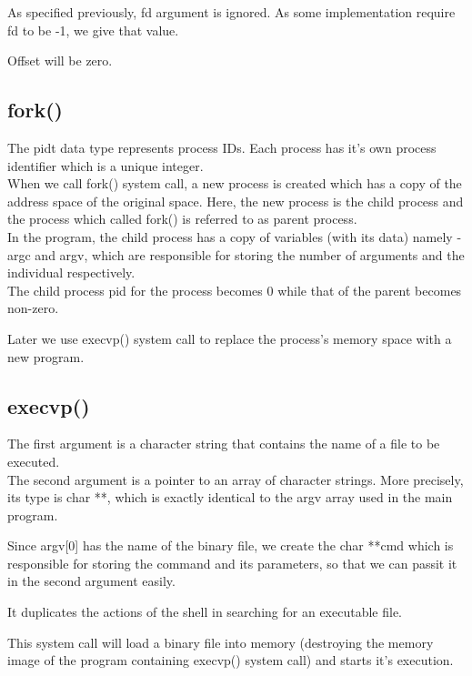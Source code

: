 \documentclass[12pt]{article}
\begin{document}
As specified previously, fd argument is ignored. As some implementation require fd to be -1, we give that value.

Offset will be zero.

\subsection{fork()}

The pid\textunderscore t  data type represents process IDs. Each process has it's own process identifier which is a unique integer. \\

When we call fork() system call, a new process is created which has a copy of the address space of the original space. Here, the new process is the child process and the process which called fork() is referred to as parent process. \\

In the program, the child process has a copy of variables (with its data) namely -  argc and argv, which are responsible for storing the number of arguments and the individual respectively. \\

The child process pid for the process becomes 0 while that of the parent becomes non-zero.

Later we use execvp() system call to replace the process's memory space with a new program.

\subsection{execvp()}

The first argument is a character string that contains the name of a file to be executed.\\
The second argument is a pointer to an array of character strings. More precisely, its type is char **, which is exactly identical to the argv array used in the main program.

Since argv[0] has the name of the binary file, we create the char **cmd which is responsible for storing the command and its parameters, so that we can passit it in the second argument easily.

It duplicates the actions of the shell in searching for an executable file.

This system call will load a binary file into memory (destroying the memory image of the program containing execvp() system call) and starts it's execution.\\
\end{document}
